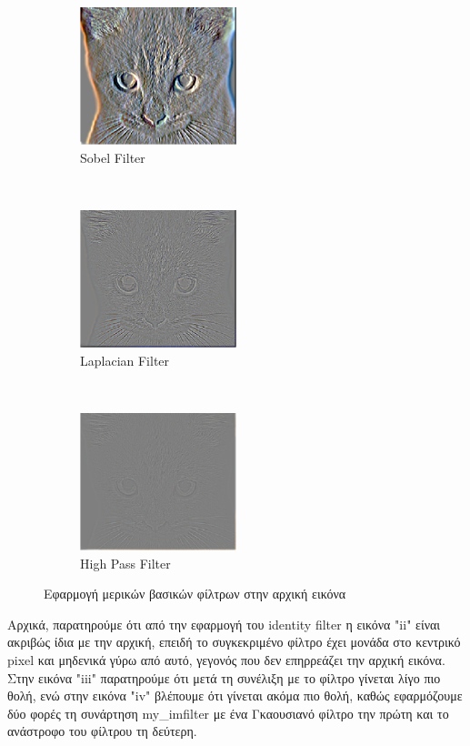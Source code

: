 \documentclass{article}
\newcommand{\tl}[1]{\textlatin{#1}}
\begin{document}
\begin{figure}[H]
		\begin{subfigure}[t]{0.2\textwidth}
			\centering
			\includegraphics[height=4cm, width=\linewidth]{./res/fig_3_5.eps}
			\caption{\tl{Sobel Filter}}
		\end{subfigure}%
		~
		\begin{subfigure}[t]{0.2\textwidth}
			\centering
			\includegraphics[height=4cm, width=\linewidth]{./res/fig_3_6.eps}
			\caption{\tl{Laplacian Filter}}
		\end{subfigure}%
		~
		\begin{subfigure}[t]{0.2\textwidth}
			\centering
			\includegraphics[height=4cm, width=\linewidth]{./res/fig_3_7.eps}
			\caption{\tl{High Pass Filter}}
		\end{subfigure}
		\caption{Εφαρμογή μερικών βασικών φίλτρων στην αρχική εικόνα}
	\end{figure}

	\noindent
	Αρχικά, παρατηρούμε ότι από την εφαρμογή του \tl{identity filter} η εικόνα \tl{"ii"} είναι ακριβώς ίδια με την αρχική, επειδή το συγκεκριμένο φίλτρο έχει μονάδα στο κεντρικό \tl{pixel} και μηδενικά γύρω από αυτό, γεγονός που δεν επηρρεάζει την αρχική εικόνα.	Στην εικόνα \tl{"iii"} παρατηρούμε ότι μετά τη συνέλιξη με το φίλτρο γίνεται λίγο πιο θολή, ενώ στην εικόνα \tl{"iv"} βλέπουμε ότι γίνεται ακόμα πιο θολή, καθώς εφαρμόζουμε δύο φορές τη συνάρτηση \tl{my\_imfilter} με ένα Γκαουσιανό φίλτρο την πρώτη και το ανάστροφο του φίλτρου τη δεύτερη.\\
	
\end{document}
